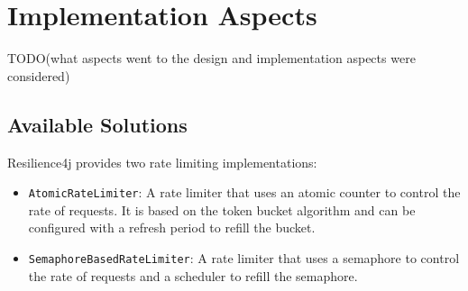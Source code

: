 \section{Implementation Aspects}\label{sec:rate-limiter-implementation}

TODO(what aspects went to the design and implementation aspects were considered)

\subsection{Available Solutions}\label{subsec:rate-limiter-solutions}

Resilience4j provides two rate limiting implementations:
\begin{itemize}
    \item \texttt{AtomicRateLimiter}: A rate limiter that uses an atomic counter to control the rate of requests.
    It is based on the token bucket algorithm and can be configured with a refresh period to refill the bucket.
    \item \texttt{SemaphoreBasedRateLimiter}:
    A rate limiter that uses a semaphore to control the rate of requests and a scheduler to refill the semaphore.
\end{itemize}


